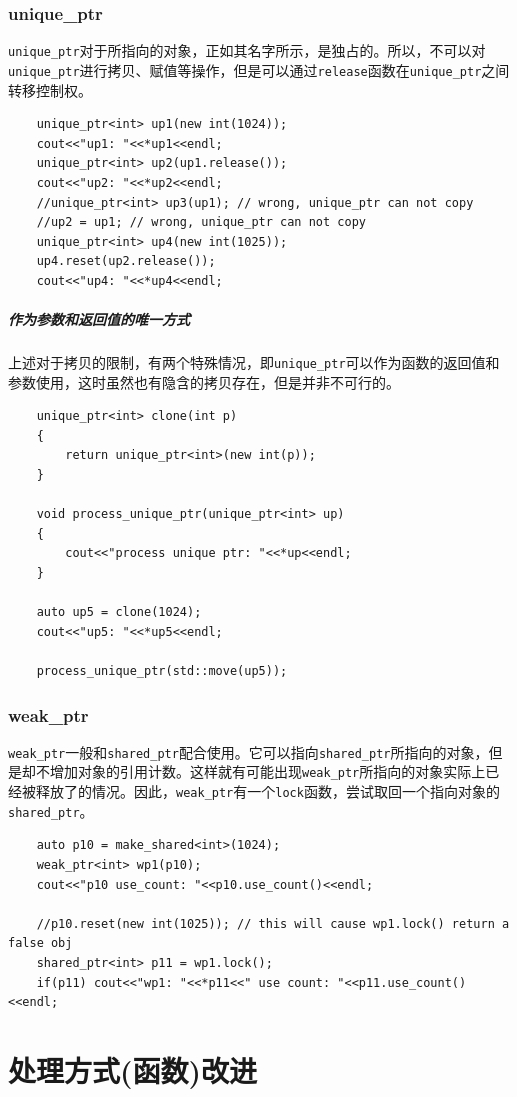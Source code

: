 \documentclass[UTF8,a4paper,12pt]{ctexbook} %
\begin{document}
			\subsubsection{unique\_ptr}
				\verb|unique_ptr|对于所指向的对象，正如其名字所示，是独占的。所以，不可以对\verb|unique_ptr|进行拷贝、赋值等操作，但是可以通过\verb|release|函数在\verb|unique_ptr|之间转移控制权。
				\begin{lstlisting}
	unique_ptr<int> up1(new int(1024));
	cout<<"up1: "<<*up1<<endl;
	unique_ptr<int> up2(up1.release());
	cout<<"up2: "<<*up2<<endl;
	//unique_ptr<int> up3(up1); // wrong, unique_ptr can not copy
	//up2 = up1; // wrong, unique_ptr can not copy
	unique_ptr<int> up4(new int(1025));
	up4.reset(up2.release());
	cout<<"up4: "<<*up4<<endl;
				\end{lstlisting}
			\subparagraph{作为参数和返回值的唯一方式}上述对于拷贝的限制，有两个特殊情况，即\verb|unique_ptr|可以作为函数的返回值和参数使用，这时虽然也有隐含的拷贝存在，但是并非不可行的。
				\begin{lstlisting}
	unique_ptr<int> clone(int p)
	{
		return unique_ptr<int>(new int(p));
	}
	
	void process_unique_ptr(unique_ptr<int> up)
	{
		cout<<"process unique ptr: "<<*up<<endl;
	}
	
	auto up5 = clone(1024);
	cout<<"up5: "<<*up5<<endl;
	
	process_unique_ptr(std::move(up5));
				\end{lstlisting}

			\subsubsection{weak\_ptr}\verb|weak_ptr|一般和\verb|shared_ptr|配合使用。它可以指向\verb|shared_ptr|所指向的对象，但是却不增加对象的引用计数。这样就有可能出现\verb|weak_ptr|所指向的对象实际上已经被释放了的情况。因此，\verb|weak_ptr|有一个\verb|lock|函数，尝试取回一个指向对象的\verb|shared_ptr|。
				\begin{lstlisting}
	auto p10 = make_shared<int>(1024);
	weak_ptr<int> wp1(p10);
	cout<<"p10 use_count: "<<p10.use_count()<<endl;
	
	//p10.reset(new int(1025)); // this will cause wp1.lock() return a false obj
	shared_ptr<int> p11 = wp1.lock();
	if(p11) cout<<"wp1: "<<*p11<<" use count: "<<p11.use_count()<<endl;
				\end{lstlisting}
	\section{处理方式(函数)改进}
\end{document}
